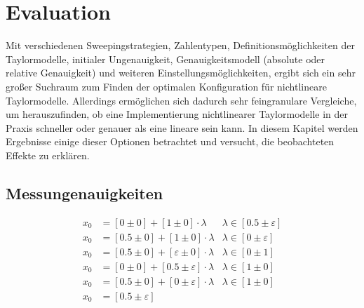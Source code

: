 
\chapter{Evaluation}
\label{ch:Evaluierung}
Mit verschiedenen Sweepingstrategien, Zahlentypen, Definitionsmöglichkeiten der Taylormodelle, initialer Ungenauigkeit, Genauigkeitsmodell (absolute oder relative Genauigkeit) und weiteren Einstellungsmöglichkeiten, ergibt sich ein sehr großer Suchraum zum Finden der optimalen Konfiguration für nichtlineare Taylormodelle. Allerdings ermöglichen sich dadurch sehr feingranulare Vergleiche, um herauszufinden, ob eine Implementierung nichtlinearer Taylormodelle in der Praxis schneller oder genauer als eine lineare sein kann. In diesem Kapitel werden Ergebnisse einige dieser Optionen betrachtet und versucht, die beobachteten Effekte zu erklären.

\section{Messungenauigkeiten}
\begin{align}
    x_0 &= [0 \pm 0] + [1 \pm 0] \cdot \lambda & \lambda \in [0.5 \pm \varepsilon] \label{tm1} \\ 
    x_0 &= [0.5 \pm 0] + [1 \pm 0] \cdot \lambda & \lambda \in [0 \pm \varepsilon] \label{tm2} \\
    x_0 &= [0.5 \pm 0] + [\varepsilon \pm 0] \cdot \lambda & \lambda \in [0 \pm 1] \label{tm3} \\
    x_0 &= [0 \pm 0] + [0.5 \pm \varepsilon] \cdot \lambda & \lambda \in [1 \pm 0] \label{tm4} \\
    x_0 &= [0.5 \pm 0] + [0 \pm \varepsilon] \cdot \lambda & \lambda \in [1 \pm 0] \label{tm5} \\
    x_0 &= [0.5 \pm \varepsilon] \label{tm6}
\end{align}


% 
% 
% 
% 
% 
% 
%


\label{ch:Evaluierung:sec:zusammenfassung}



